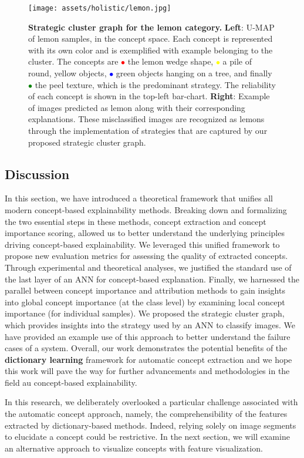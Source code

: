 \begin{figure}[ht]
\begin{center}
   \texttt{[image: assets/holistic/lemon.jpg]}
\end{center}
   \caption{\textbf{Strategic cluster graph for the lemon category.} \textbf{Left}: U-MAP of lemon samples, in the concept space. Each concept is represented with its own color and is exemplified with example belonging to the cluster. The concepts are  \textcolor{red}{$\bullet$} the lemon wedge shape, \textcolor{yellow}{$\bullet$} a pile of round, yellow objects, \textcolor{blue}{$\bullet$} green objects hanging on a tree, and finally \textcolor{green}{$\bullet$} the peel texture, which is the predominant strategy. The reliability of each concept is shown in the top-left bar-chart. \textbf{Right}: 
   Example of images predicted as lemon along with their corresponding explanations. These misclassified images are recognized as lemons through the implementation of strategies that are captured by our proposed strategic cluster graph.
   }
\label{fig:holistic:lemon}
\end{figure}


\subsection{Discussion}

In this section, we have introduced a theoretical framework that unifies all modern concept-based explainability methods. Breaking down and formalizing the two essential steps in these methods, concept extraction and concept importance scoring, allowed us to better understand the underlying principles driving concept-based explainability. We leveraged this unified framework to propose new evaluation metrics for assessing the quality of extracted concepts. Through experimental and theoretical analyses, we justified the standard use of the last layer of an ANN for concept-based explanation. Finally, we harnessed the parallel between concept importance and attribution methods to gain insights into global concept importance (at the class level) by examining local concept importance (for individual samples). We proposed the strategic cluster graph, which provides insights into the strategy used by an ANN to classify images. We have provided an example use of this approach to better understand the failure cases of a system. Overall, our work demonstrates the potential benefits of the \textbf{dictionary learning} framework for automatic concept extraction and we hope this work will pave the way for further advancements and methodologies in the field au concept-based explainability.


In this research, we deliberately overlooked a particular challenge associated with the automatic concept approach, namely, the comprehensibility of the features extracted by dictionary-based methods. Indeed, relying solely on image segments to elucidate a concept could be restrictive. In the next section, we will examine an alternative approach to visualize concepts with feature visualization.
